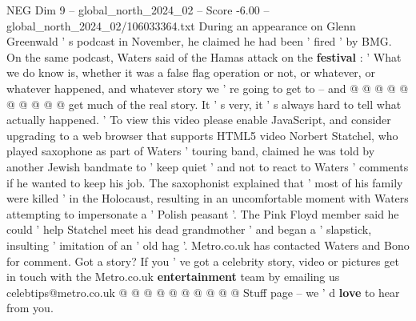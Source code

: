 \begin{textsample}{NEG Dim 9 – global\_north\_2024\_02 – Score -6.00 – global\_north\_2024\_02/106033364.txt}
During an appearance on Glenn Greenwald ' s podcast in November, he claimed he had been ' fired ' by BMG.
On the same podcast, Waters said of the Hamas attack on the \textbf{festival} : ' What we do know is, whether it was a false flag operation or not, or whatever, or whatever happened, and whatever story we ' re going to get to -- and @ @ @ @ @ @ @ @ @ @ get much of the real story.
It ' s very, it ' s always hard to tell what actually happened. ' To view this video please enable JavaScript, and consider upgrading to a web browser that supports HTML5 video Norbert Statchel, who played saxophone as part of Waters ' touring band, claimed he was told by another Jewish bandmate to ' keep quiet ' and not to react to Waters ' comments if he wanted to keep his job.
The saxophonist explained that ' most of his family were killed ' in the Holocaust, resulting in an uncomfortable moment with Waters attempting to impersonate a ' Polish peasant '.
The Pink Floyd member said he could ' help Statchel meet his dead grandmother ' and began a ' slapstick, insulting ' imitation of an ' old hag '.
Metro.co.uk has contacted Waters and Bono for comment.
Got a story?
If you ' ve got a celebrity story, video or pictures get in touch with the Metro.co.uk \textbf{entertainment} team by emailing us celebtips@metro.co.uk @ @ @ @ @ @ @ @ @ @ Stuff page -- we ' d \textbf{love} to hear from you.

\end{textsample}
